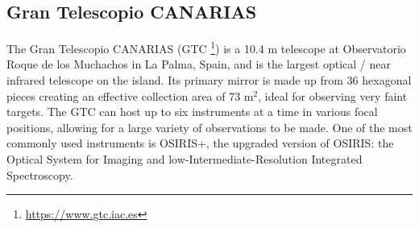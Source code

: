 \documentclass[a4paper,oneside,12pt, class=Latex/Classes/PhDthesisPSnPDF, crop=false]{standalone}
\begin{document}

\subsection{Gran Telescopio CANARIAS}
The Gran Telescopio CANARIAS (GTC \footnote{\url{https://www.gtc.iac.es}}) is a 10.4 m telescope at Observatorio Roque de los Muchachos in La Palma, Spain, and is the largest optical / near infrared telescope on the island. Its primary mirror is made up from 36 hexagonal pieces creating an effective collection area of 73 m$^2$, ideal for observing very faint targets. The GTC can host up to six instruments at a time in various focal positions, allowing for a large variety of observations to be made. One of the most commonly used instruments is OSIRIS+, the upgraded version of OSIRIS: the Optical System for Imaging and low-Intermediate-Resolution Integrated Spectroscopy.
\end{document}
